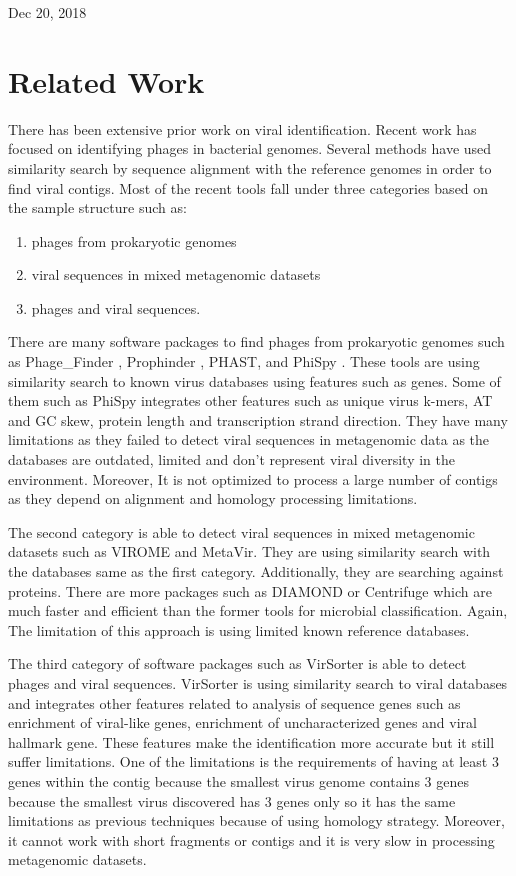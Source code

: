 \documentclass[10pt,journal,compsoc]{IEEEtran}
\begin{document}
\hfill Dec 20, 2018


\section{Related Work}

There has been extensive prior work on viral identification. Recent work has focused on identifying phages in bacterial genomes. Several methods have used similarity search by sequence alignment with the reference genomes in order to find viral contigs. Most of the recent tools fall under three categories based on the sample structure such as:
\begin{enumerate}
	\item phages from prokaryotic genomes
	\item viral sequences in mixed metagenomic datasets
	\item phages and viral sequences. 
\end{enumerate} 

There are many software packages to find phages from prokaryotic genomes such as Phage\_Finder \cite{fouts2006phage_finder}, Prophinder \cite{lima2008prophinder}, PHAST\cite{zhou2011phast}, and PhiSpy \cite{akhter2012phispy}. These tools are using similarity search to known virus databases using features such as genes. Some of them such as PhiSpy integrates other features such as  unique virus k-mers, AT and GC skew, protein length and transcription strand direction. They have many limitations as they failed to detect viral sequences in metagenomic data as the databases are outdated, limited and don't represent viral diversity in the environment. Moreover, It is not optimized to process a large number of contigs \cite{roux2015virsorter} as they depend on alignment and homology processing limitations. 

The second category is able to detect viral sequences in mixed metagenomic datasets such as VIROME \cite{wommack2012virome} and MetaVir\cite{roux2011metavir}. They are using similarity search with the databases same as the first category. Additionally, they are searching against proteins. There are more packages such as DIAMOND \cite{buchfink2014Diamond} or Centrifuge \cite{kim2016centrifuge} which are much faster and efficient than the former tools for microbial classification. Again, The limitation of this approach is using limited known reference databases. 

The third category of software packages such as VirSorter \cite{roux2015virsorter} is able to detect phages and viral sequences. VirSorter is using similarity search to viral databases and integrates other features related to analysis of sequence genes such as enrichment of viral-like genes, enrichment of uncharacterized genes and viral hallmark gene. These features make the identification more accurate but it still suffer limitations. One of the limitations is the requirements of having at least 3 genes within the contig because the smallest virus genome contains 3 genes because the smallest virus discovered has 3 genes only so it has the same limitations as previous techniques because of using homology strategy. Moreover, it cannot work with short fragments or contigs and it is very slow in processing metagenomic datasets. 
\end{document}
